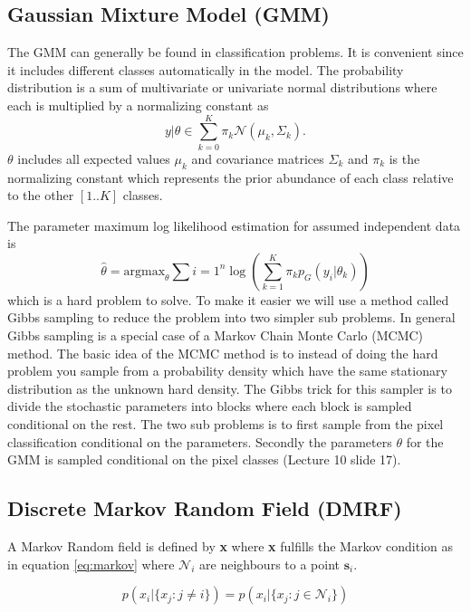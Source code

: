 \documentclass[a4paper,english]{article}
\begin{document}
\subsection{Gaussian Mixture Model (GMM)}
The GMM can generally be found in classification problems.
It is convenient since it includes different classes automatically in the model.
The probability distribution is a sum of multivariate or univariate normal distributions where each is multiplied by a normalizing constant as
\begin{equation}
  y | \theta \in \sum_{k = 0}^K \pi_k \mathcal{N}(\mu_k, \Sigma_k).
  \label{eq:gmm}
\end{equation}
$\theta$ includes all expected values $\mu_k$ and covariance matrices $\Sigma_k$ and $\pi_k$ is the normalizing constant which represents the prior abundance of each class relative to the other $[1..K]$ classes.

The parameter maximum log likelihood estimation for assumed independent data is
\begin{equation}
  \hat{\theta} = \text{argmax}_{\theta} \sum{i = 1}^n \log \left(  \sum_{k=1}^K \pi_k p_G(y_i | \theta_k) \right)
\end{equation}
which is a hard problem to solve.
To make it easier we will use a method called Gibbs sampling to reduce the problem into two simpler sub problems.
In general Gibbs sampling is a special case of a Markov Chain Monte Carlo (MCMC) method.
The basic idea of the MCMC method is to instead of doing the hard problem you sample from a probability density which have the same stationary distribution as the unknown hard density.
The Gibbs trick for this sampler is to divide the stochastic parameters into blocks where each block is sampled conditional on the rest.
The two sub problems is to first sample from the pixel classification conditional on the parameters.
Secondly the parameters $\theta$ for the GMM is sampled conditional on the pixel classes (Lecture 10 slide 17\cite{L10}).

\subsection{Discrete Markov Random Field (DMRF)}

A Markov Random field is defined by \textbf{x} where \textbf{x} fulfills the Markov condition as in equation \ref{eq:markov} where $\mathcal{N}_i$ are neighbours to a point $\textbf{s}_i$.

\begin{equation}
	p(x_i|\{x_j : j\neq i\}) = p(x_i|\{x_j : j\in \mathcal{N}_i\})
	\label{eq:markov}
\end{equation}
\end{document}
